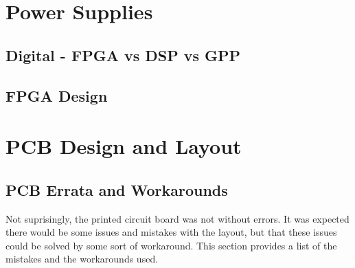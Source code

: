 \documentclass[a4paper, 12pt, notitlepage]{article}
\begin{document}
\section{Power Supplies}

\subsection{Digital - FPGA vs DSP vs GPP}

\subsection{FPGA Design}
\label{sec:fpga_system}

\section{PCB Design and Layout}
\subsection{PCB Errata and Workarounds}
Not suprisingly, the printed circuit board was not without errors.  It was expected there would be some issues and mistakes with the layout, but that these issues could be solved by some sort of workaround.  This section provides a list of the mistakes and the workarounds used.
\end{document}
